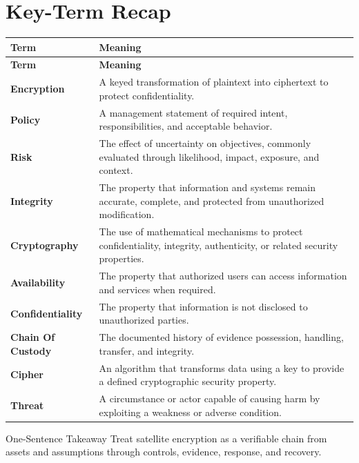 \documentclass[11pt,letterpaper]{article}
\begin{document}
\section*{Key-Term Recap}
\begin{longtable}{>{\raggedright\arraybackslash}p{}>{\raggedright\arraybackslash}p{}}
\toprule\rowcolor{Navy}\color{white}\textbf{Term} & \color{white}\textbf{Meaning}\\\midrule
\endfirsthead
\toprule\rowcolor{Navy}\color{white}\textbf{Term} & \color{white}\textbf{Meaning}\\\midrule
\endhead
\textbf{Encryption} & A keyed transformation of plaintext into ciphertext to protect confidentiality. \\\midrule
\textbf{Policy} & A management statement of required intent, responsibilities, and acceptable behavior. \\\midrule
\textbf{Risk} & The effect of uncertainty on objectives, commonly evaluated through likelihood, impact, exposure, and context. \\\midrule
\textbf{Integrity} & The property that information and systems remain accurate, complete, and protected from unauthorized modification. \\\midrule
\textbf{Cryptography} & The use of mathematical mechanisms to protect confidentiality, integrity, authenticity, or related security properties. \\\midrule
\textbf{Availability} & The property that authorized users can access information and services when required. \\\midrule
\textbf{Confidentiality} & The property that information is not disclosed to unauthorized parties. \\\midrule
\textbf{Chain Of Custody} & The documented history of evidence possession, handling, transfer, and integrity. \\\midrule
\textbf{Cipher} & An algorithm that transforms data using a key to provide a defined cryptographic security property. \\\midrule
\textbf{Threat} & A circumstance or actor capable of causing harm by exploiting a weakness or adverse condition. \\\midrule
\bottomrule
\end{longtable}
\begin{CornellExamBox}{One-Sentence Takeaway}
Treat satellite encryption as a verifiable chain from assets and assumptions through controls, evidence, response, and recovery.
\end{CornellExamBox}
\end{document}
